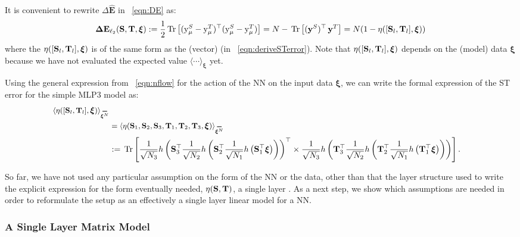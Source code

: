 It is convenient to rewrite $\Delta \mathbf{\hat{E}}$ in \EQN~\ref{eqn:DE} as:
\begin{align}
\label{eqn:DE2}
\mathbf{\Delta {E}}_{\ell_2}({\mathbf{S}},{\mathbf{T}}, \boldsymbol{\xi})
   := \frac{1}{2} \mbox{}\operatorname{Tr}\left[ (\mathrm{y}_{\mu}^{S} - \mathrm{y}_{\mu}^{T})^\top (\mathrm{y}_{\mu}^{S} - \mathrm{y}_{\mu}^{T}) \right]
   = N - \mbox{}\operatorname{Tr}\left[ (\mathbf{y}^{S})^{\top} \, \mathbf{y}^{T}  \right]
   = N(1 - \eta([{\mathbf{S}}_l,{\mathbf{T}}_l],\boldsymbol{\xi}))
\end{align}
where the \SelfOverlap $\eta([{\mathbf{S}}_l,{\mathbf{T}}_l],\boldsymbol{\xi})$
is of the same form as the (vector) \LinearPerceptron (in \EQN~\ref{eqn:deriveSTerror}).
Note that $\eta([{\mathbf{S}}_l,{\mathbf{T}}_l],\boldsymbol{\xi})$ depends on the (model) data $\boldsymbol{\xi}$
because we have not evaluated the expected value $\langle \cdots \rangle_{\boldsymbol{\xi}}$ yet.

Using the general expression from \EQN~\ref{eqn:nflow} for the action of the NN on the input data $\boldsymbol{\xi}$,
we can write the formal expression of the ST error for the simple MLP3 model as:
\begin{align}
\label{eqn:overlap1}
\ETAMLPAVG  \\ \nonumber
& =\langle\ETA(\SMAT_1,\SMAT_2,\SMAT_3,\TMAT_1,\TMAT_2,\TMAT_3,\boldsymbol{\xi})\rangle_{\AVGNDXI}  \\ \nonumber
& :=  \Trace{
    \frac{1}{\sqrt{N_3}} h\left(\mathbf{S}_3^{\top} 
    \frac{1}{\sqrt{N_2}} h\left(\mathbf{S}_2^{\top} 
    \frac{1}{\sqrt{N_1}} h\left(\mathbf{S}_1^{\top} \boldsymbol{\xi} \right)\right)\right)^{\top} 
    \times
    \frac{1}{\sqrt{N_3}} h\left(\mathbf{T}_3^{\top} 
    \frac{1}{\sqrt{N_2}} h\left(\mathbf{T}_2^{\top} 
    \frac{1}{\sqrt{N_1}} h\left(\mathbf{T}_1^{\top} \boldsymbol{\xi} \right)\right)\right)
  }.
\end{align}

So far, we have not used any particular assumption on the form of the NN or the data, 
other than that the layer structure used to write the explicit expression for the form eventually needed,
$\eta({\mathbf{S}},{\mathbf{T}})$, a single layer \SelfOverlap.
As a next step, we show which assumptions are needed in order to reformulate the setup as
an effectively a single layer linear model for a NN.


\subsubsection{A Single Layer Matrix Model}


